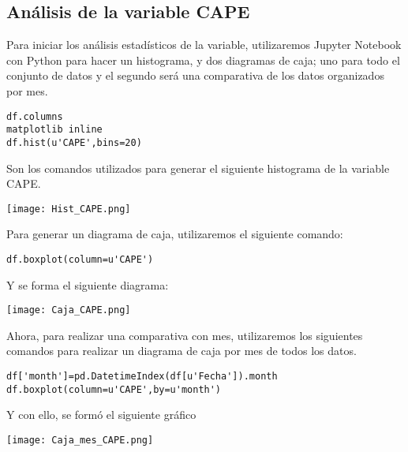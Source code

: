 \documentclass{article}
\begin{document}
\subsection{\huge Análisis de la variable CAPE}
\bigskip
Para iniciar los análisis estadísticos de la variable, utilizaremos Jupyter Notebook con Python para hacer un histograma, y dos diagramas de caja; uno para todo el conjunto de datos y el segundo será una comparativa de los datos organizados por mes.
\bigskip
\begin{verbatim}
df.columns 
matplotlib inline
df.hist(u'CAPE',bins=20)
\end{verbatim}
\bigskip
Son los comandos utilizados para generar el siguiente histograma de la variable CAPE.\\
\begin{center}
\texttt{[image: Hist\_CAPE.png]}
\end{center}
\bigskip
Para generar un diagrama de caja, utilizaremos el siguiente comando:
\begin{verbatim}
df.boxplot(column=u'CAPE')
\end{verbatim}
\bigskip
Y se forma el siguiente diagrama:\\
\begin{center}
\texttt{[image: Caja\_CAPE.png]}
\end{center}
\bigskip
Ahora, para realizar una comparativa con mes, utilizaremos los siguientes comandos para realizar un diagrama de caja por mes de todos los datos.
\begin{verbatim}
df['month']=pd.DatetimeIndex(df[u'Fecha']).month
df.boxplot(column=u'CAPE',by=u'month')
\end{verbatim}
\bigskip
Y con ello, se formó el siguiente gráfico\\
\begin{center}
\texttt{[image: Caja\_mes\_CAPE.png]}
\end{center}
\newpage
\end{document}
